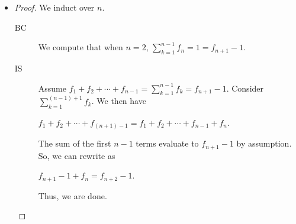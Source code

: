 \documentclass[12pt]{article}
\begin{document}
\begin{enumerate}[start = 1, label = {\bfseries Question \arabic*:}, leftmargin=1in]
\begin{itemize}
        \item[(c)] \begin{proof}We induct over $n$.\begin{description}
            \item[BC] We compute that when $n=2$, $\sum\limits_{k=1}^{n-1}f_n=1=f_{n+1}-1$.
            \item[IS] Assume $f_1+f_2+\cdots+f_{n-1}=\sum\limits_{k=1}^{n-1}f_k=f_{n+1}-1$. Consider $\sum\limits_{k=1}^{(n-1)+1}f_k$. We then have \begin{center}
                $f_1+f_2+\cdots+f_{(n+1)-1}=f_1+f_2+\cdots+f_{n-1}+f_n$.
            \end{center} The sum of the first $n-1$ terms evaluate to $f_{n+1}-1$ by assumption. So, we can rewrite as \begin{center}
                $f_{n+1}-1+f_n=f_{n+2}-1$.
            \end{center} Thus, we are done.
        \end{description}
    \end{proof}


\end{itemize}
\end{enumerate}
\end{document}
